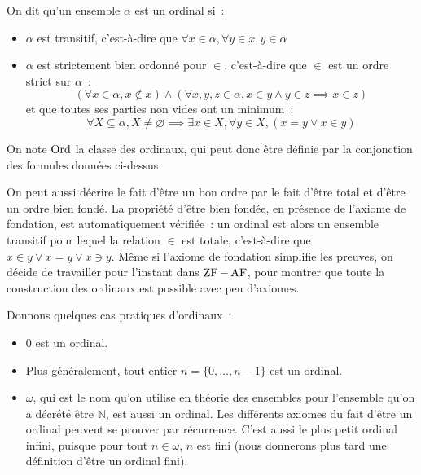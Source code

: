 \begin{definition}[Ordinal]
  On dit qu'un ensemble $\alpha$ est un ordinal si~:
  \begin{itemize}
  \item $\alpha$ est transitif, c'est-à-dire que
    $\forall x\in \alpha, \forall y \in x, y\in \alpha$
  \item $\alpha$ est strictement bien ordonné pour $\in$, c'est-à-dire que 
    $\in$ est un ordre strict sur $\alpha$~:
    \[(\forall x\in \alpha, x\notin x)\land (\forall x,y,z\in \alpha,
    x\in y \land y \in z \implies x \in z)\]
    et que toutes ses parties non vides ont un minimum~:
    \[\forall X\subseteq \alpha, X\neq\varnothing\implies
    \exists x \in X, \forall y \in X, (x=y \lor x \in y)\]
  \end{itemize}

  On note $\operatorname{Ord}$ la classe des ordinaux, qui peut donc être définie par la
  conjonction des formules données ci-dessus.
\end{definition}

\begin{remark}
  On peut aussi décrire le fait d'être un bon ordre par le fait d'être total
  et d'être un ordre bien fondé. La propriété d'être bien fondée, en présence
  de l'axiome de fondation, est automatiquement vérifiée~: un ordinal est alors
  un ensemble transitif pour lequel la relation $\in$ est totale,
  c'est-à-dire que $x\in y \lor x = y \lor x\ni y$. Même si l'axiome de
  fondation simplifie les preuves, on décide de travailler pour l'instant dans
  $\operatorname{ZF} - \operatorname{AF}$, pour montrer que toute la construction des ordinaux est possible
  avec peu d'axiomes.
\end{remark}

\begin{example}
  Donnons quelques cas pratiques d'ordinaux~:
  \begin{itemize}
  \item $0$ est un ordinal.
  \item Plus généralement, tout entier $n = \{0,\ldots,n-1\}$ est un ordinal.
  \item $\omega$, qui est le nom qu'on utilise en théorie des ensembles pour
    l'ensemble qu'on a décrété être $\mathbb N$, est aussi un ordinal. Les
    différents axiomes du fait d'être un ordinal peuvent se prouver par
    récurrence. C'est aussi le plus petit ordinal infini, puisque pour tout
    $n\in \omega$, $n$ est fini (nous donnerons plus tard une définition d'être
    un ordinal fini).
  \end{itemize}
\end{example}

